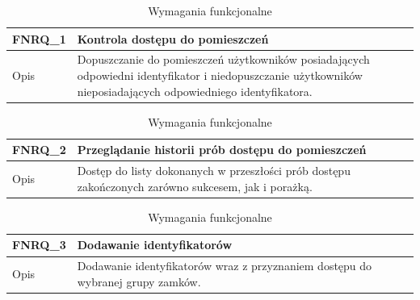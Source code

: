         \begin{table}[h!]
            \caption{Wymagania funkcjonalne}
            \centering
            \begin{subtable}[c]{\textwidth}
                \centering
                \begin{tabular}{|p{2cm}|p{12cm}|}
                    \hline FNRQ\_1      & \textbf{Kontrola dostępu do pomieszczeń}  \\
                    \hline \cellcolor[gray]{0.8} Opis         & Dopuszczanie do pomieszczeń użytkowników posiadających odpowiedni identyfikator i niedopuszczanie użytkowników nieposiadających odpowiedniego identyfikatora.  \\
                    \hline
                \end{tabular}
                \label{tbl:fnrq1}
                \vspace{10mm}           
            \end{subtable}
        \quad%
            \begin{subtable}[c]{\textwidth}
                \centering
                 \begin{tabular}{|p{2cm}|p{12cm}|}
                    \hline FNRQ\_2      & \textbf{Przeglądanie historii prób dostępu do pomieszczeń}  \\
                    \hline \cellcolor[gray]{0.8} Opis         & Dostęp do listy dokonanych w przeszłości prób dostępu zakończonych zarówno sukcesem, jak i porażką. \\
                    \hline
                \end{tabular}
                \label{tbl:fnrq2}
                \vspace{10mm}           
            \end{subtable}
            \begin{subtable}[c]{\textwidth}
                \centering
                 \begin{tabular}{|p{2cm}|p{12cm}|}
                    \hline FNRQ\_3      & \textbf{Dodawanie identyfikatorów}  \\
                    \hline \cellcolor[gray]{0.8} Opis         & Dodawanie identyfikatorów wraz z przyznaniem dostępu do wybranej grupy zamków. \\
                    \hline
                \end{tabular}
                \label{tbl:fnrq3}
                \vspace{10mm}           
            \end{subtable}

\end{table}
